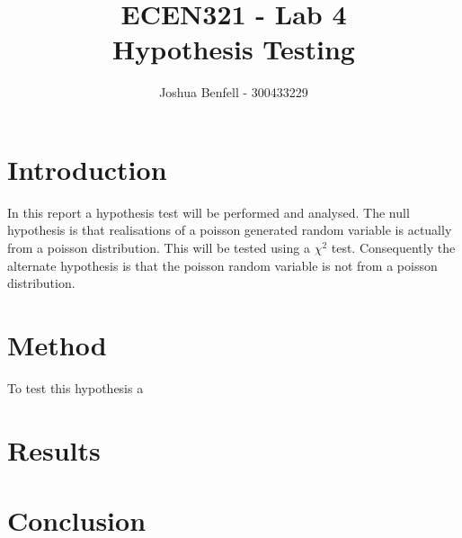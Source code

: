 \documentclass[a4paper, 12pt]{article}
\title{ECEN321 - Lab 4 \\
    Hypothesis Testing
}
\author{Joshua Benfell - 300433229}
\begin{document}
    \maketitle
    
    \section{Introduction}
        In this report a hypothesis test will be performed and analysed. The null hypothesis is that realisations of a poisson generated random variable is actually from a poisson distribution. This will be tested using a $\chi^2$ test. Consequently the alternate hypothesis is that the poisson random variable is not from a poisson distribution.

    \section{Method}
        To test this hypothesis a
    \section{Results}
    \section{Conclusion}


    \begin{appendices}
    \end{appendices}
\end{document}
